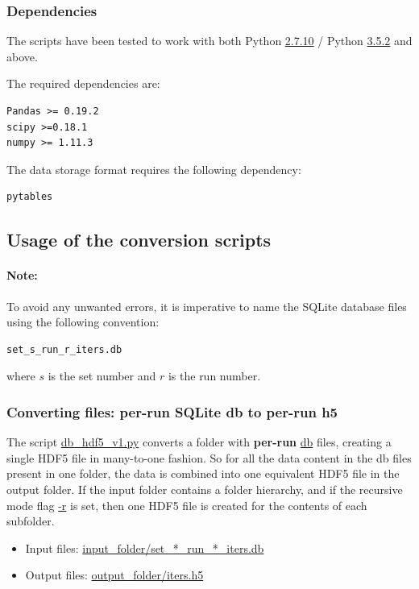 \documentclass[10pt,a4paper]{article}
\begin{document}
\subsubsection*{Dependencies}
The scripts have been tested to work with both Python \url{2.7.10} / Python \url{3.5.2} and above.

The required dependencies are:
\begin{verbatim}
Pandas >= 0.19.2
scipy >=0.18.1
numpy >= 1.11.3
\end{verbatim}

The data storage format requires the following dependency:

\begin{verbatim}
pytables
\end{verbatim}

\subsection{Usage of the conversion scripts}

\paragraph{Note:}
To avoid any unwanted errors, it is imperative to name the SQLite database files using the following convention:

\begin{verbatim}
set_s_run_r_iters.db
\end{verbatim}
where $s$ is the set number and $r$ is the run number.
 
\subsubsection{Converting files: per-run SQLite db to per-run h5}
The script \url{db_hdf5_v1.py} converts a folder with \textbf{per-run} \url{db} files, creating a single HDF5 file in many-to-one fashion.
So for all the data content in the db files present in one folder, the data is combined into one equivalent HDF5 file in the output folder. 
If the input folder contains a folder hierarchy, and if the recursive mode flag \url{-r} is set, then one HDF5 file is created for the contents of each subfolder.

\begin{itemize}
\item Input files: \url{input_folder/set_*_run_*_iters.db}

\item Output files: \url{output_folder/iters.h5}
\end{itemize}
\end{document}
